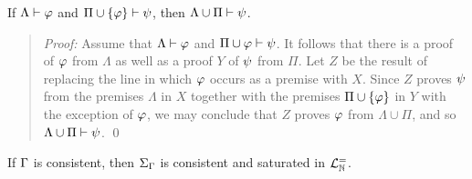 \begin{Lthm} \label{lemma:FOL-prcut}
  If $\Lambda \vdash \varphi$ and $\Pi\cup\lbrace\varphi\rbrace \vdash \psi$, then $\Lambda\cup\Pi \vdash \psi$. 
\end{Lthm}

\begin{quote} 
  \textit{Proof:} Assume that $\Lambda \vdash \varphi$ and $\Pi\cup{\ensuremath{\varphi}} \vdash \psi$.
  It follows that there is a proof of $\varphi$ from $\Lambda$ as well as a proof $Y$ of $\psi$ from $\Pi$. 
  Let $Z$ be the result of replacing the line in which $\varphi$ occurs as a premise with $X$.
  Since $Z$ proves $\psi$ from the premises $\Lambda$ in $X$ together with the premises $\Pi\cup\lbrace\varphi\rbrace$ in $Y$ with the exception of $\varphi$, we may conclude that $Z$ proves $\varphi$ from $\Lambda\cup\Pi$, and so $\Lambda\cup\Pi\vdash\psi$.
  \qed
\end{quote}





\begin{Lthm} \label{lemma:FOL-sat}
  If $\Gamma$ is consistent, then $\Sigma_{\Gamma}$ is consistent and saturated in $\mathcal{L}^{=}_{\mathbb{N}}$. 
\end{Lthm}

